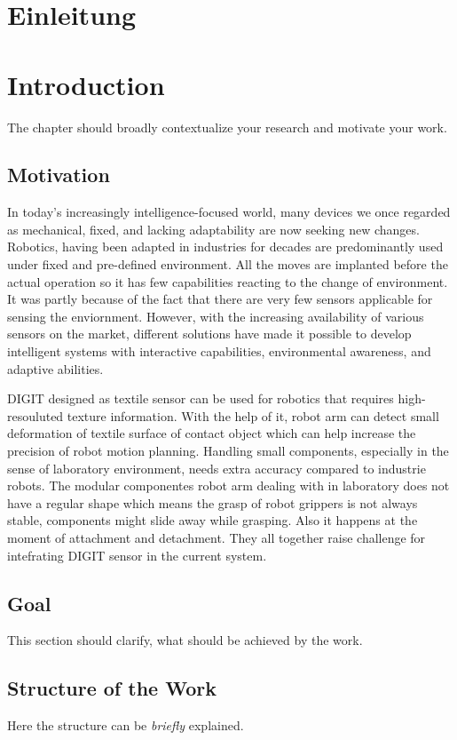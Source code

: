 {\chapter{Einleitung}}
{\chapter{Introduction}}

\label{sec:introduction}
The chapter should broadly contextualize your research and motivate your work.

\section{Motivation}
In today's increasingly intelligence-focused world, many devices we once regarded as mechanical, fixed, and lacking adaptability are now seeking new changes. Robotics, having been adapted in industries for decades are predominantly used under fixed and pre-defined environment. All the moves are implanted before the actual operation so it has few capabilities reacting to the change of environment. It was partly because of the fact that there are very few sensors applicable for sensing the enviornment. However, with the increasing availability of various sensors on the market, different solutions have made it possible to develop intelligent systems with interactive capabilities, environmental awareness, and adaptive abilities.

DIGIT \cite{Mike2020} designed as textile sensor can be used for robotics that requires high-resouluted texture information. With the help of it, robot arm can detect small deformation of textile surface of contact object which can help increase the precision of robot motion planning. Handling small components, especially in the sense of laboratory environment, needs extra accuracy compared to industrie robots. The modular componentes robot arm dealing with in laboratory does not have a regular shape which means the grasp of robot grippers is not always stable, components might slide away while grasping. Also it happens at the moment of attachment and detachment. They all together raise challenge for intefrating DIGIT sensor in the current system.

\section{Goal}
This section should clarify, what should be achieved by the work.

\section{Structure of the Work}
Here the structure can be \emph{briefly} explained.


